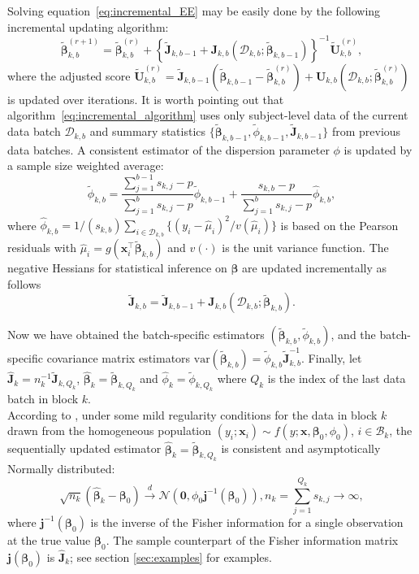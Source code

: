 \documentclass[12pt]{article}
\newcommand{\bJ}{\boldsymbol{J}}
\newcommand{\bU}{\boldsymbol{U}}
\newcommand{\bx}{\boldsymbol{x}}
\newcommand{\bbeta}{\boldsymbol{\beta}}
\begin{document}
Solving equation~\eqref{eq:incremental_EE} may be easily done by the following incremental updating algorithm:
\begin{equation}\label{eq:incremental_algorithm}
\widetilde{\bbeta}_{k,b}^{(r+1)} = \widetilde{\bbeta}_{k,b}^{(r)} + 
\left\{\widetilde{\bJ}_{k,b-1} + \bJ_{k,b}(\mathcal{D}_{k,b};\widetilde{\bbeta}_{k,b-1}) \right\}^{-1}
\widetilde{\bU}_{k,b}^{(r)},
\end{equation}
where the adjusted score $\widetilde{\bU}_{k,b}^{(r)} = \widetilde{\bJ}_{k,b-1} (\widetilde{ \bbeta}_{k,b-1} - \widetilde{\bbeta}_{k,b}^{(r)}) + \bU_{k,b}(\mathcal{D}_{k,b};\widetilde{\bbeta}_{k,b}^{(r)})$ is updated over iterations. It is worth pointing out that algorithm~\eqref{eq:incremental_algorithm} uses only subject-level data of the current data batch $\mathcal{D}_{k,b}$ and summary statistics $\{\widetilde{\bbeta}_{k,b-1},\widetilde{\phi}_{k,b-1}, \widetilde{\bJ}_{k,b-1} \}$ from previous data batches. A consistent estimator of the dispersion parameter $\phi$ is updated by a sample size weighted average:
\[
\widetilde{\phi}_{k,b} = \frac{\sum_{j=1}^{b-1}s_{k,j}-p}{\sum_{j=1}^b s_{k,j} - p} \widetilde{\phi}_{k,b-1} + \frac{s_{k,b} - p}{\sum_{j=1}^b s_{k,j} - p} \widehat{\phi}_{k,b},
\]
where $\widehat{\phi}_{k,b}=1/(s_{k,b}) \sum_{i \in \mathcal{D}_{k,b}} \{ (y_i-\widehat{\mu}_i)^2 / v(\widehat{\mu}_i) \}$ is based on the Pearson residuals with $\widehat{\mu}_i=g(\bx_i^\top\widetilde{\bbeta}_{k,b})$ and $v(\cdot)$ is the unit variance function. The negative Hessians for statistical inference on $\bbeta$ are updated incrementally as follows
\begin{equation}\label{eq:incre_J}
\widetilde{\bJ}_{k,b} = \widetilde{\bJ}_{k,b-1} + \bJ_{k,b}(\mathcal{D}_{k,b};\widetilde{\bbeta}_{k,b}).
\end{equation}

Now we have obtained the batch-specific estimators $(\widetilde{\bbeta}_{k,b}, \widetilde{\phi}_{k,b})$, and the batch-specific covariance matrix estimators $\text{var}(\widetilde{\bbeta}_{k,b}) = \widetilde{\phi}_{k,b} \widetilde{\bJ}_{k,b}^{-1}$. Finally, let $\widehat{\bJ}_k=n_k^{-1}\widetilde{\bJ}_{k,Q_k}$, $\widehat{\bbeta}_k=\widetilde{\bbeta}_{k,Q_k}$ and $\widehat{\phi}_k=\widetilde{\phi}_{k,Q_k}$ where $Q_k$ is the index of the last data batch in block $k$.\\
According to \cite{Luo-Song-2020}, under some mild regularity conditions for the data in block $k$ drawn from the homogeneous population $(y_i;\bx_i)\sim f(y;\bx,\bbeta_0,\phi_0)$, $i \in \mathcal{B}_{k}$, the sequentially updated estimator $\widehat{\bbeta}_k=\widetilde{\bbeta}_{k,Q_k}$ is consistent and asymptotically Normally distributed:
\[
\sqrt{n_k}(\widehat{\bbeta}_k - \bbeta_{0}) \overset{d}{\to} \mathcal{N}\left(\bm{0},\phi_{0} \bm{j}^{-1}(\bbeta_{0})\right),  n_k = \sum_{j=1}^{Q_k} s_{k,j} \to\infty,
\]
where $\bm{j}^{-1}(\bbeta_{0})$ is the inverse of the Fisher information for a single observation at the true value $\bbeta_{0}$. The sample counterpart of the Fisher information matrix $\bm{j}(\bbeta_{0})$ is $\widehat{\bJ}_k$; see section \ref{sec:examples} for examples.
\end{document}
